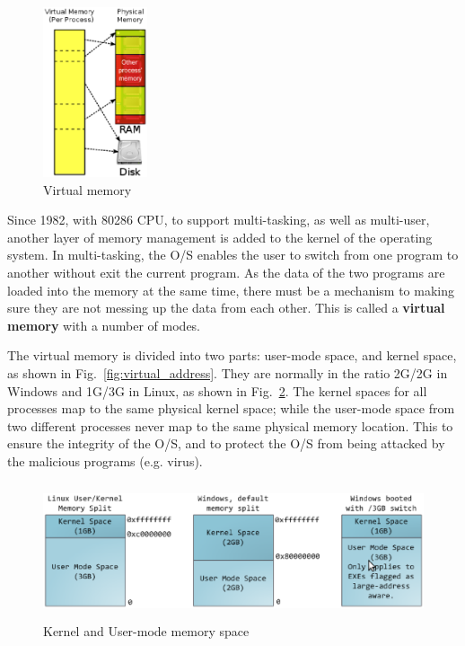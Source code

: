 \begin{figure}[hbt]
  \centerline{\includegraphics[height=5cm,
    angle=0]{./images/virtual_memory.eps}}
\caption{Virtual memory}
\label{fig:virtual_memory}
\end{figure}

Since 1982, with 80286 CPU, to support multi-tasking, as well as multi-user,
another layer of memory management is added to the kernel of the operating
system. In multi-tasking, the O/S enables the user to switch from one program
to another without exit the current program. As the data of the two programs
are loaded into the memory at the same time, there must be a mechanism to making
sure they are not messing up the data from each other. This is called a {\bf
virtual memory} with a number of modes.

The virtual memory is divided into two parts: user-mode space, and
kernel space, as shown in Fig.~\ref{fig:virtual_address}. They are
normally in the ratio 2G/2G in Windows and 1G/3G in Linux, as shown in
Fig.~\ref{fig:kernel_user}.  The kernel spaces for all processes map
to the same physical kernel space; while the user-mode space from two
different processes never map to the same physical memory location. 
This to ensure the integrity of the O/S, and to protect the O/S from being
attacked by the malicious programs (e.g. virus).

\begin{figure}[hbt]
  \centerline{\includegraphics[height=4cm,
    angle=0]{./images/kernel_user_memory.eps}}
\caption{Kernel and User-mode memory space}
\label{fig:kernel_user}
\end{figure}

